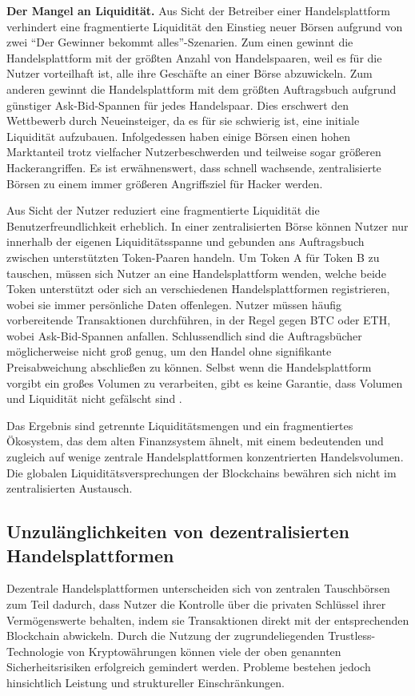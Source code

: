 \documentclass[UTF8,nofonts]{article}
\begin{document}
\begin{multicols}{2}
\textbf{Der Mangel an Liquidität.} Aus Sicht der Betreiber einer Handelsplattform verhindert eine fragmentierte Liquidität den Einstieg neuer Börsen aufgrund von zwei \enquote{Der Gewinner bekommt alles}-Szenarien. Zum einen gewinnt die Handelsplattform mit der größten Anzahl von Handelspaaren, weil es für die Nutzer vorteilhaft ist, alle ihre Geschäfte an einer Börse abzuwickeln. Zum anderen gewinnt die Handelsplattform mit dem größten Auftragsbuch aufgrund günstiger Ask-Bid-Spannen für jedes Handelspaar. Dies erschwert den Wettbewerb durch Neueinsteiger, da es für sie schwierig ist, eine initiale Liquidität aufzubauen. Infolgedessen haben einige Börsen einen hohen Marktanteil trotz vielfacher Nutzerbeschwerden und teilweise sogar größeren Hackerangriffen. Es ist erwähnenswert, dass schnell wachsende, zentralisierte Börsen zu einem immer größeren Angriffsziel für Hacker werden.

Aus Sicht der Nutzer reduziert eine fragmentierte Liquidität die Benutzerfreundlichkeit erheblich. In einer zentralisierten Börse können Nutzer nur innerhalb der eigenen Liquiditätsspanne und gebunden ans Auftragsbuch zwischen unterstützten Token-Paaren handeln. Um Token A für Token B zu tauschen, müssen sich Nutzer an eine Handelsplattform wenden, welche beide Token unterstützt oder sich an verschiedenen Handelsplattformen registrieren, wobei sie immer persönliche Daten offenlegen. Nutzer müssen häufig vorbereitende Transaktionen durchführen, in der Regel gegen BTC oder ETH, wobei Ask-Bid-Spannen anfallen. Schlussendlich sind die Auftragsbücher möglicherweise nicht groß genug, um den Handel ohne signifikante Preisabweichung abschließen zu können. Selbst wenn die Handelsplattform vorgibt ein großes Volumen zu verarbeiten, gibt es keine Garantie, dass Volumen und Liquidität nicht gefälscht sind \cite{fakevolume}.

Das Ergebnis sind getrennte Liquiditätsmengen und ein fragmentiertes Ökosystem, das dem alten Finanzsystem ähnelt, mit einem bedeutenden und zugleich auf wenige zentrale Handelsplattformen konzentrierten Handelsvolumen. Die globalen Liquiditätsversprechungen der Blockchains bewähren sich nicht im zentralisierten Austausch.

\subsection{Unzulänglichkeiten von dezentralisierten Handelsplattformen}
Dezentrale Handelsplattformen unterscheiden sich von zentralen Tauschbörsen zum Teil dadurch, dass Nutzer die Kontrolle über die privaten Schlüssel ihrer Vermögenswerte behalten, indem sie Transaktionen direkt mit der entsprechenden Blockchain abwickeln. Durch die Nutzung der zugrundeliegenden Trustless-Technologie von Kryptowährungen können viele der oben genannten Sicherheitsrisiken erfolgreich gemindert werden. Probleme bestehen jedoch hinsichtlich Leistung und struktureller Einschränkungen.


\end{multicols}
\end{document}
